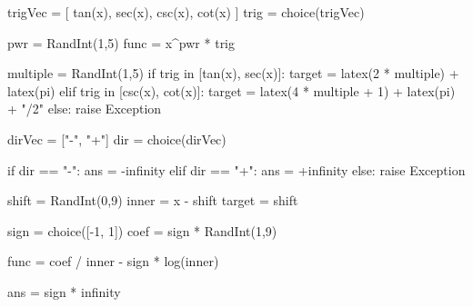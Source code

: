 \begin{sagesilent}

trigVec = [
    tan(x),
    sec(x),
    csc(x),
    cot(x)
]
trig = choice(trigVec)

pwr = RandInt(1,5)
func = x^pwr * trig

multiple = RandInt(1,5)
if trig in [tan(x), sec(x)]:
    target = latex(2 * multiple) + latex(pi)
elif trig in [csc(x), cot(x)]:
    target = latex(4 * multiple + 1) + latex(pi) + "/2"
else:
    raise Exception

dirVec = ["-", "+"]
dir = choice(dirVec)

if dir == "-":
    ans = -infinity
elif dir == "+":
    ans = +infinity
else:
    raise Exception

\end{sagesilent}


\begin{sagesilent}

shift = RandInt(0,9)
inner = x - shift
target = shift

sign = choice([-1, 1])
coef = sign * RandInt(1,9)

func = coef / inner - sign * log(inner)

ans = sign * infinity

\end{sagesilent}


